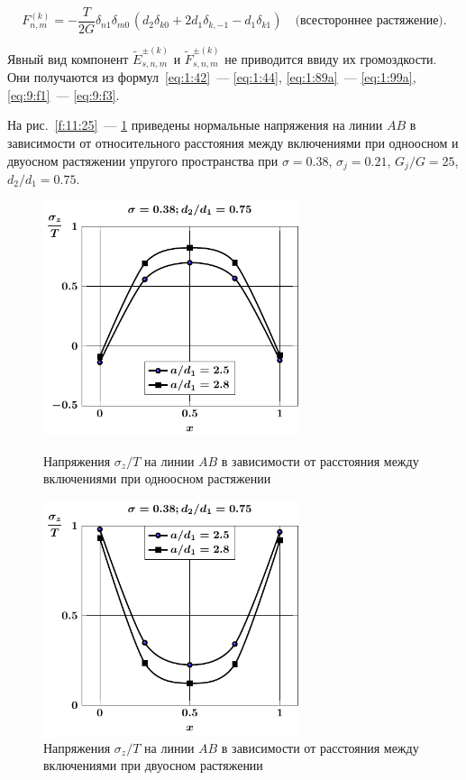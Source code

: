\begin{equation*}
F_{n,m}^{(k)} =  -\frac{T}{2G}{\delta _{n1}}{\delta _{m0\,}}(d_2\delta_{k0}+2d_1{\delta _{k, - 1}} - d_1{\delta _{k1}})\quad\text{(всестороннее растяжение)}.
\end{equation*}

Явный вид компонент $\tilde E_{s,n,m}^{\pm(k)}$ и $\tilde F_{s,n,m}^{\pm(k)}$ не приводится ввиду их громоздкости. Они получаются из формул~\eqref{eq:1:42}~--- \eqref{eq:1:44}, \eqref{eq:1:89a}~--- \eqref{eq:1:99a}, \eqref{eq:9:f1}~--- \eqref{eq:9:f3}.

На рис.~\ref{f:11:25}~--- \ref{f:11:30} приведены нормальные напряжения на линии $AB$ в зависимости от относительного расстояния между включениями при одноосном и двуосном растяжении упругого пространства при $\sigma=0.38$, $\sigma_j=0.21$, $G_j/G=25$, $d_2/d_1=0.75$.

\begin{figure}[h!]
\centering\footnotesize
\parbox[b]{7.5cm}{\centering\includegraphics[width=7.5cm]{periodic-inc27-a-d75-g25-t1-sig_z.pdf}
\caption{Напряжения $\sigma_z/T$ на линии $AB$ в зависимости от расстояния между включениями при одноосном растяжении
\label{f:11:29}}}\hfil\hfil
\parbox[b]{7.5cm}{\centering\includegraphics[width=7.5cm]{periodic-inc27-a-d75-g25-t2-sig_z.pdf}
\caption{Напряжения $\sigma_z/T$ на линии $AB$ в зависимости от расстояния между включениями при двуосном растяжении
\label{f:11:30}}}
\end{figure}


